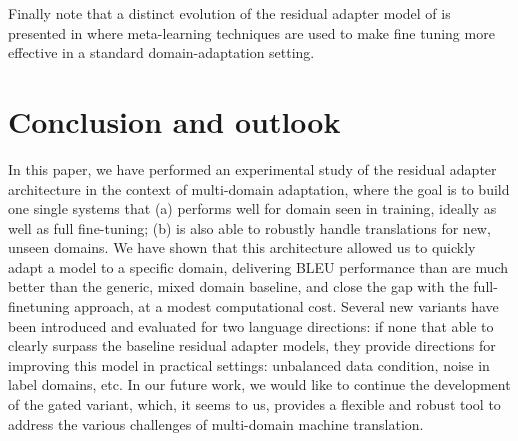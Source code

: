 \documentclass[11pt,a4paper]{article}
\newcommand{\fyFuture}[1]{\done[FY]\Todo[FY:]{\textcolor{red}{#1}}}
\newcommand{\mpTodo}[1]{\Todo[MP:]{\textcolor{green}{#1}}}
\newcommand{\mpDone}[1]{\done[MP]\Todo[MP:]{\textcolor{green}{#1}}}
\begin{document}
Finally note that a distinct evolution of the residual adapter model of \cite{Bapna19simple} is presented in \cite{Sharaf20metalearning} where meta-learning techniques are used to make fine tuning more effective in a standard domain-adaptation setting.

\section{Conclusion and outlook \label{sec:discussion}}
\mpDone{discussion}
In this paper, we have performed an experimental study of the residual adapter architecture in the context of multi-domain adaptation, where the goal is to build one single systems that (a) performs well for domain seen in training, ideally as well as full fine-tuning; (b) is also able to robustly handle translations for new, unseen domains. We have shown that this architecture allowed us to quickly adapt a model to a specific domain, delivering BLEU performance than are much better than the generic, mixed domain baseline, and close the gap with the full-finetuning approach, at a modest computational cost. Several new variants have been introduced and evaluated for two language directions: if none that able to clearly surpass the baseline residual adapter models, they provide directions for improving this model in practical settings: unbalanced data condition, noise in label domains, etc. In our future work, we would like to continue the development of the gated variant, which, it seems to us, provides a flexible and robust tool to address the various challenges of multi-domain machine translation. 


\fyFuture{Example of gating ?}
\fyFuture{Why MDMT does not work well - full train from generic?}
\fyFuture{Structured domain? A Bayesian version?}
\fyFuture{Let the machine decide domains in learning? - domains and their organization - how could it?}

\fyFuture{Thank you Jean Zay}



\end{document}
